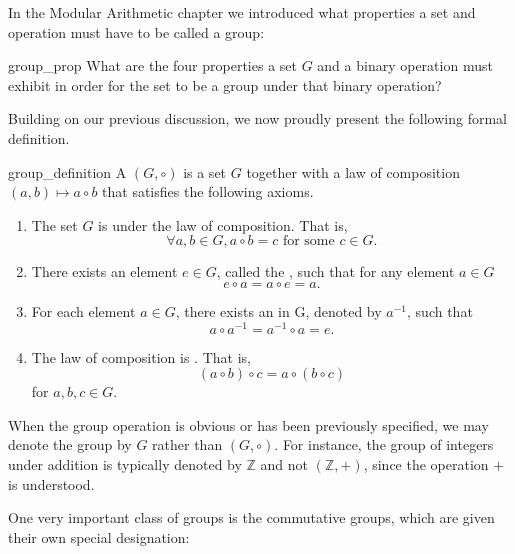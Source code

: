 In the Modular Arithmetic chapter we introduced what properties a set and operation must have to be called a group:

\begin{exercise}{group_prop}
What are the four properties a set $G$ and a binary operation must exhibit in order for the set to be a group under that binary operation?
\end{exercise}
Building on our previous discussion, we now  proudly present the following formal definition.

\begin{defn}{group_definition}
 A  $(G, \circ )$ is a set $G$ together with a law of composition $(a,b) \mapsto a \circ b$ that satisfies the following axioms. 
\begin{enumerate}
\item
The set $G$ is  under the law of composition.  That is, 
\[
\forall a,b \in G, a \circ b = c \mbox{ for some } c \in G .
\]
\item
There exists an element $e \in G$, called the , such that for any element $a \in G$ 
\[
e \circ a = a \circ e = a.
\]
\item
For each element $a \in G$, there exists an  in G, denoted by $a^{-1}$, such that 
\[
a \circ a^{-1} = a^{-1} \circ a = e.
\]
\item
The law of composition is . That is,
\[
(a \circ b) \circ c = a \circ (b \circ c)
\]
for $a, b, c \in G$.
 
\end{enumerate}
\end{defn}

\begin{rem}
When the group operation is obvious or has been previously specified, we may denote the group by $G$ rather than $(G,\circ)$.  For instance, the group of integers under addition is typically denoted by ${\mathbb Z}$ and not $({\mathbb Z},+)$, since the operation $+$ is understood. 
\end{rem}

One very important class of groups is the commutative groups, which are given their own special designation:

